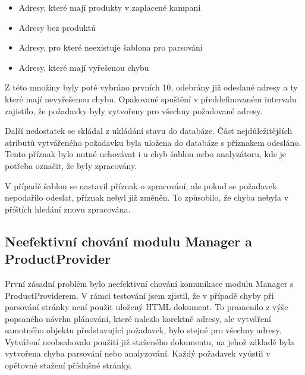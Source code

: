 \documentclass[thesis=B,czech]{FITthesis}[2012/06/26]
\begin{document}
\begin{itemize}
\item Adresy, které mají produkty v zaplacené kampani
\item Adresy bez produktů
\item Adresy, pro které neexistuje šablona pro parsování
\item Adresy, které mají vyřešenou chybu
\end{itemize}

Z této množiny byly poté vybráno prvních 10, odebrány již odeslané adresy a ty které mají nevyřešenou chybu. Opakované spuštění v předdefinovaném 
intervalu zajistilo, že požadavky byly vytvořeny pro všechny požadované adresy.
\par
Další nedostatek se skládal z ukládání stavu do databáze. Část nejdůležitějších atributů vytvářeného požadavku byla uložena do databáze 
s příznakem odesláno. Tento příznak bylo nutné uchovávat i u chyb šablon nebo analyzátoru, kde je potřeba označit, že byly zpracovány. 
\par
V případě šablon se nastavil příznak o zpracování, ale pokud se požadavek nepodařilo odeslat, příznak nebyl již změněn. To způsobilo, že chyba nebyla v příštích hledání znovu zpracována.

\subsection{Neefektivní chování modulu Manager a ProductProvider}\label{ch:manager-pd}
První zásadní problém bylo neefektivní chování komunikace modulu Manager s ProductProviderem. V rámci testování jsem zjistil, že v 
případě chyby při parsování stránky není použit uložený HTML dokument.
To pramenilo z výše popsaného návrhu plánování, které nalezlo korektně adresy, ale vytváření samotného objektu představující požadavek,
bylo stejné pro všechny adresy. Vytváření neobsahovalo použití již staženého dokumentu, na jehož základě byla vytvořena 
chyba parsování nebo analyzování. Každý požadavek vyústil v opětovné stažení příslušné stránky.
\end{document}
